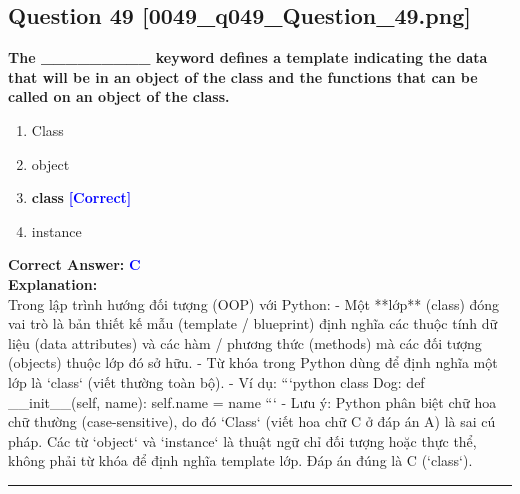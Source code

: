 \documentclass[11pt,a4paper]{article}
\begin{document}
\begin{minipage}{\textwidth}
\subsection*{Question 49 \quad \footnotesize{[0049_q049_Question_49.png]}}
\noindent \textbf{The _________ keyword defines a template indicating the data that will be in an object of the class and the functions that can be called on an object of the class.}

\begin{enumerate}[label=\Alph*.]
    \item Class
    \item object
    \item \textbf{class} \hfill \textcolor{blue}{\textbf{[Correct]}}
    \item instance
\end{enumerate}

\noindent \textbf{Correct Answer:} \textcolor{blue}{\textbf{C}} \\[4pt]
\noindent \textbf{Explanation:}\\
Trong lập trình hướng đối tượng (OOP) với Python:\newline
- Một **lớp** (class) đóng vai trò là bản thiết kế mẫu (template / blueprint) định nghĩa các thuộc tính dữ liệu (data attributes) và các hàm / phương thức (methods) mà các đối tượng (objects) thuộc lớp đó sở hữu.\newline
- Từ khóa trong Python dùng để định nghĩa một lớp là `class` (viết thường toàn bộ).\newline
- Ví dụ:\newline
  ```python\newline
  class Dog:\newline
      def __init__(self, name):\newline
          self.name = name\newline
  ```\newline
- Lưu ý: Python phân biệt chữ hoa chữ thường (case-sensitive), do đó `Class` (viết hoa chữ C ở đáp án A) là sai cú pháp. Các từ `object` và `instance` là thuật ngữ chỉ đối tượng hoặc thực thể, không phải từ khóa để định nghĩa template lớp.\newline
Đáp án đúng là C (`class`).
\end{minipage}
\vspace{0.8cm}
\hrule
\vspace{0.5cm}
\end{document}
